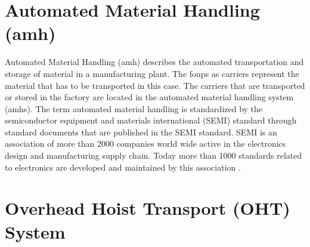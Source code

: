 \section{Automated Material Handling (\gls{amh})}
\label{sec:AMH}
Automated Material Handling (\gls{amh}) describes the automated transportation and storage of material in a manufacturing plant. The \gls{foup}s as carriers represent the material that has to be transported in this case. The carriers that are transported or stored in the factory are located in the automated material handling system (\gls{amhs}). The term automated material handling is standardized by the semiconductor equipment and materials international (SEMI) standard through standard documents that are published in the SEMI standard. SEMI is an association of more than 2000 companies world wide active in the electronics design and manufacturing supply chain. Today more than 1000 standards related to electronics are developed and maintained by this association \cite{SEMI}\cite{Semi.org}.


\section{Overhead Hoist Transport (OHT) System}
\label{sec:OHT}


\newpage